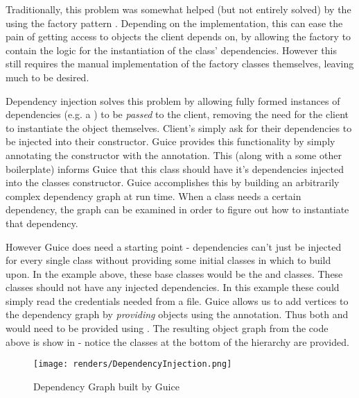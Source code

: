

Traditionally, this problem was somewhat helped (but not entirely solved) by the using the factory pattern \cite{factoryMethodPattern}. Depending on the implementation, this can ease the pain of getting access to objects the client depends on, by allowing the factory to contain the logic for the instantiation of the class' dependencies. However this still requires the manual implementation of the factory classes themselves, leaving much to be desired.


Dependency injection solves this problem by allowing fully formed instances of dependencies (e.g. a ) to be \textit{passed} to the client, removing the need for the client to instantiate the object themselves. Client's simply ask for their dependencies to be injected into their constructor. Guice provides this functionality by simply annotating the constructor with the  annotation. This (along with a some other boilerplate) informs Guice that this class should have it's dependencies injected into the classes constructor. Guice accomplishes this by building an arbitrarily complex dependency graph at run time. When a class needs a certain dependency, the graph can be examined in order to figure out how to instantiate that dependency. 

However Guice does need a starting point - dependencies can't just be injected for every single class without providing some initial classes in which to build upon. In the example above, these base classes would be the  and  classes. These classes should not have any injected dependencies. In this example these could simply read the credentials needed from a file. Guice allows us to add vertices to the dependency graph by \textit{providing} objects using the  annotation. Thus both  and  would need to be provided using . The resulting object graph from the code above is show in  - notice the classes at the bottom of the hierarchy are provided. 

\begin{figure}[H]
      \centering
      \texttt{[image: renders/DependencyInjection.png]}
      \caption{Dependency Graph built by Guice}
      \label{fig:depGraph}
\end{figure}

